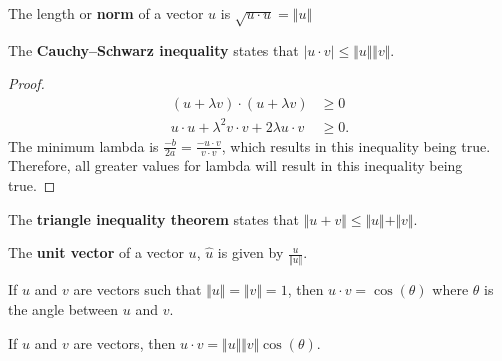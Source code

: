 \begin{definition}
	The length or \textbf{norm} of a vector \( u \) is \( \sqrt{u\cdot u} = \Vert u \Vert \)
\end{definition}

\begin{theorem}
	The \textbf{Cauchy–Schwarz inequality} states that \( |u \cdot  v| \le \Vert u \Vert \Vert v\Vert  \).
\end{theorem}
\begin{proof}
	\begin{align*}
		(u + \lambda v) \cdot (u + \lambda v) &\ge 0 \\
		u \cdot u + \lambda^2 v \cdot v + 2\lambda u \cdot v &\ge 0
	.\end{align*}
	The minimum lambda is \( \frac{-b}{2a} = \frac{-u \cdot v}{v\cdot v}\), which results in this inequality being true. Therefore, all greater values for lambda will result in this inequality being true.
\end{proof}

\begin{theorem}
	The \textbf{triangle inequality theorem} states that \( \Vert u + v \Vert \le  \Vert u \Vert + \Vert v \Vert \).
\end{theorem}

\begin{definition}
	The \textbf{unit vector} of a vector \( u \), \( \hat{u} \) is given by \( \frac{u}{\Vert u \Vert} \).
\end{definition}

\begin{theorem}
	If \( u \) and \( v \) are vectors such that \( \Vert u \Vert = \Vert v \Vert = 1 \), then \( u\cdot v = \cos(\theta) \) where \( \theta \) is the angle between \( u \) and \( v \).
\end{theorem}

\begin{theorem}
	If \( u \) and \( v \) are vectors, then \( u\cdot v = \Vert u \Vert \Vert v \Vert \cos (\theta)\).
\end{theorem}

